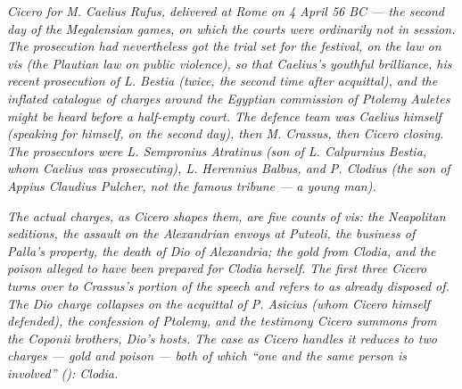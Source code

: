 
\textit{Cicero for M. Caelius Rufus, delivered at Rome on 4
April 56 BC --- the second day of the Megalensian games, on
which the courts were ordinarily not in session. The
prosecution had nevertheless got the trial set for the
festival, on the law on \textit{vis} (the Plautian law on
public violence), so that Caelius's youthful brilliance, his
recent prosecution of L. Bestia (twice, the second time after
acquittal), and the inflated catalogue of charges around the
Egyptian commission of Ptolemy Auletes might be heard before a
half-empty court. The defence team was Caelius himself
(speaking for himself, on the second day), then M. Crassus, then
Cicero closing. The prosecutors were L. Sempronius Atratinus
(son of L. Calpurnius Bestia, whom Caelius was prosecuting), L.
Herennius Balbus, and P. Clodius (the son of Appius Claudius
Pulcher, not the famous tribune --- a young man).}

\textit{The actual charges, as Cicero shapes them, are five
counts of \textit{vis}:  the Neapolitan
seditions, the assault on the Alexandrian envoys at Puteoli, the
business of Palla's property, the death of Dio of Alexandria;
 the gold from Clodia, and the poison alleged to
have been prepared for Clodia herself. The first three Cicero
turns over to Crassus's portion of the speech and refers
to as already disposed of. The Dio charge collapses on the
acquittal of P. Asicius (whom Cicero himself defended), the
confession of Ptolemy, and the testimony Cicero summons from
the Coponii brothers, Dio's hosts. The case as Cicero handles
it reduces to two charges --- gold and poison --- both of which
``one and the same person is involved'' (): Clodia.}

